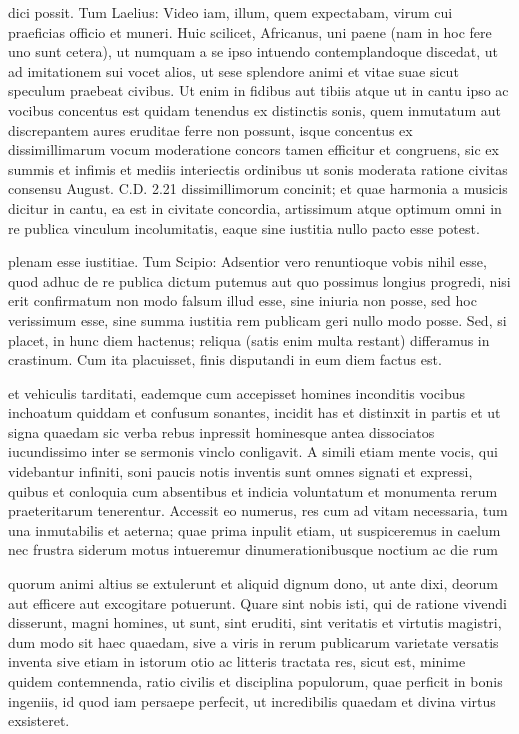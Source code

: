  dici possit. Tum Laelius: Video iam, illum, quem expectabam, virum cui praeficias officio et muneri. Huic scilicet, Africanus, uni paene (nam in hoc fere uno sunt cetera), ut numquam a se ipso intuendo contemplandoque discedat, ut ad imitationem sui vocet alios, ut sese splendore animi et vitae suae sicut speculum praebeat civibus. Ut enim in fidibus aut tibiis atque ut in cantu ipso ac vocibus concentus est quidam tenendus ex distinctis sonis, quem inmutatum aut discrepantem aures eruditae ferre non possunt, isque concentus ex dissimillimarum vocum moderatione concors tamen efficitur et congruens, sic ex summis et infimis et mediis interiectis ordinibus ut sonis moderata ratione civitas consensu August. C.D. 2.21 dissimillimorum concinit; et quae harmonia a musicis dicitur in cantu, ea est in civitate concordia, artissimum atque optimum omni in re publica vinculum incolumitatis, eaque sine iustitia nullo pacto esse potest.

 plenam esse iustitiae. Tum Scipio: Adsentior vero renuntioque vobis nihil esse, quod adhuc de re publica dictum putemus aut quo possimus longius progredi, nisi erit confirmatum non modo falsum illud esse, sine iniuria non posse, sed hoc verissimum esse, sine summa iustitia rem publicam geri nullo modo posse. Sed, si placet, in hunc diem hactenus; reliqua (satis enim multa restant) differamus in crastinum. Cum ita placuisset, finis disputandi in eum diem factus est.


 et vehiculis tarditati, eademque cum accepisset homines inconditis vocibus inchoatum quiddam et confusum sonantes, incidit has et distinxit in partis et ut signa quaedam sic verba rebus inpressit hominesque antea dissociatos iucundissimo inter se sermonis vinclo conligavit. A simili etiam mente vocis, qui videbantur infiniti, soni paucis notis inventis sunt omnes signati et expressi, quibus et conloquia cum absentibus et indicia voluntatum et monumenta rerum praeteritarum tenerentur. Accessit eo numerus, res cum ad vitam necessaria, tum una inmutabilis et aeterna; quae prima inpulit etiam, ut suspiceremus in caelum nec frustra siderum motus intueremur dinumerationibusque noctium ac die rum

 quorum animi altius se extulerunt et aliquid dignum dono, ut ante dixi, deorum aut efficere aut excogitare potuerunt. Quare sint nobis isti, qui de ratione vivendi disserunt, magni homines, ut sunt, sint eruditi, sint veritatis et virtutis magistri, dum modo sit haec quaedam, sive a viris in rerum publicarum varietate versatis inventa sive etiam in istorum otio ac litteris tractata res, sicut est, minime quidem contemnenda, ratio civilis et disciplina populorum, quae perficit in bonis ingeniis, id quod iam persaepe perfecit, ut incredibilis quaedam et divina virtus exsisteret.

